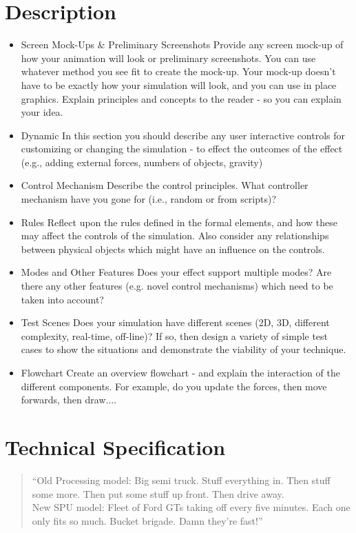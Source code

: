 \documentclass[conference]{acmsiggraph}
\begin{document}
\section{Description}

\begin{itemize}
\item {Screen Mock-Ups \& Preliminary Screenshots}
Provide any screen mock-up of how your animation will look or preliminary screenshots.  You can use whatever method you see fit to create the mock-up.  Your mock-up doesn't have to be exactly how your simulation will look, and you can use in place graphics.  Explain principles and concepts to the reader - so you can explain your idea.
\item {Dynamic}
In this section you should describe any user interactive controls for customizing or changing the simulation - to effect the outcomes of the effect (e.g., adding external forces, numbers of objects, gravity)
\item {Control Mechanism}
Describe the control principles.  What controller mechanism have you gone for (i.e., random or from scripts)?  
\item {Rules}
Reflect upon the rules defined in the formal elements, and how these may affect the controls of the simulation.  Also consider any relationships between physical objects which might have an influence on the controls.
\item {Modes and Other Features}
Does your effect support multiple modes?  Are there any other features (e.g. novel control mechanisms) which need to be taken into account?
\item {Test Scenes}
Does your simulation have different scenes (2D, 3D, different complexity, real-time, off-line)?  If so, then design a variety of simple test cases to show the situations and demonstrate the viability of your technique.
\item {Flowchart}
Create an overview flowchart - and explain the interaction of the different components.  For example, do you update the forces, then move forwards, then draw....
\end{itemize}

\section{Technical Specification}

\begin{quote}
``Old Processing model: Big semi truck. Stuff everything in. Then stuff some
more. Then put some stuff up front. Then drive
away.\\
New SPU model: Fleet of Ford GTs taking off every five minutes.
Each one only fits so much. Bucket brigade. Damn they're fast!''
 \cite{spuspeed}
\end{quote}
\end{document}

